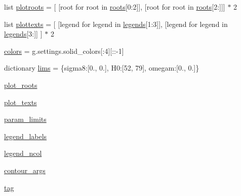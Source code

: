 \begin{DoxyCompactItemize}
\item 
list \mbox{\hyperlink{namespacesigma8__omegam__H0__neutrinos_a14654c3738c8a535ee0fe6025521cbbf}{plotroots}} = \mbox{[} \mbox{[}root for root in \mbox{\hyperlink{namespacesigma8__omegam__H0__neutrinos_ad26beb5cf572c1b26f7674dddcd76a78}{roots}}\mbox{[}0\+:2\mbox{]}\mbox{]}, \mbox{[}root for root in \mbox{\hyperlink{namespacesigma8__omegam__H0__neutrinos_ad26beb5cf572c1b26f7674dddcd76a78}{roots}}\mbox{[}2\+:\mbox{]}\mbox{]}\mbox{]} $\ast$ 2
\item 
list \mbox{\hyperlink{namespacesigma8__omegam__H0__neutrinos_a1edcde27e659769d78d150b63c56b901}{plottexts}} = \mbox{[} \mbox{[}legend for legend in \mbox{\hyperlink{namespacesigma8__omegam__H0__neutrinos_aea361e871a0ef6fe21cd7907ba18a4e9}{legends}}\mbox{[}1\+:3\mbox{]}\mbox{]}, \mbox{[}legend for legend in \mbox{\hyperlink{namespacesigma8__omegam__H0__neutrinos_aea361e871a0ef6fe21cd7907ba18a4e9}{legends}}\mbox{[}3\+:\mbox{]}\mbox{]} \mbox{]} $\ast$ 2
\item 
\mbox{\hyperlink{namespacesigma8__omegam__H0__neutrinos_a7ac226691fcd23a224df1f93fa660aa4}{colors}} = g.\+settings.\+solid\+\_\+colors\mbox{[}\+:4\mbox{]}\mbox{[}\+::-\/1\mbox{]}
\item 
dictionary \mbox{\hyperlink{namespacesigma8__omegam__H0__neutrinos_a70f3238faf5becd1f2cdea437f20b19e}{lims}} = \{\textquotesingle{}sigma8\textquotesingle{}\+:\mbox{[}0., 0.\mbox{]}, \textquotesingle{}H0\textquotesingle{}\+:\mbox{[}52, 79\mbox{]}, \textquotesingle{}omegam\textquotesingle{}\+:\mbox{[}0., 0.\mbox{]}\}
\item 
\mbox{\hyperlink{namespacesigma8__omegam__H0__neutrinos_a96862b6ca096f4c38a9b9bbb328fa9c1}{plot\+\_\+roots}}
\item 
\mbox{\hyperlink{namespacesigma8__omegam__H0__neutrinos_a32c17a221fe8b0e2f8179d263eb9c759}{plot\+\_\+texts}}
\item 
\mbox{\hyperlink{namespacesigma8__omegam__H0__neutrinos_a81400849bac7a536a5655f6d8088e3ba}{param\+\_\+limits}}
\item 
\mbox{\hyperlink{namespacesigma8__omegam__H0__neutrinos_a987e1927223a76f2165bae158de0bc2b}{legend\+\_\+labels}}
\item 
\mbox{\hyperlink{namespacesigma8__omegam__H0__neutrinos_accbae89a3d93a3c2955f0f9db1ad3a24}{legend\+\_\+ncol}}
\item 
\mbox{\hyperlink{namespacesigma8__omegam__H0__neutrinos_af957d32887042b2704813e3988b214a5}{contour\+\_\+args}}
\item 
\mbox{\hyperlink{namespacesigma8__omegam__H0__neutrinos_a050c3cd647e607a234ee3875aa9e36e1}{tag}}
\end{DoxyCompactItemize}


